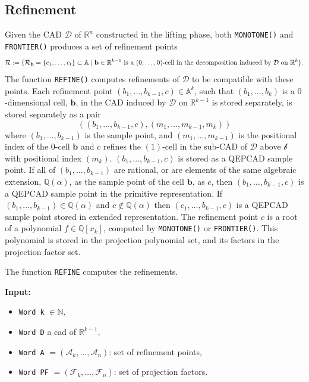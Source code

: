 \documentclass[
]{book}
\providecommand{\tightlist}{%
  \setlength{\itemsep}{0pt}\setlength{\parskip}{0pt}}
\theoremstyle{definition}
\theoremstyle{definition}
\theoremstyle{definition}
\theoremstyle{definition}
\theoremstyle{remark}
\begin{document}
\hypertarget{sec:implementation-refinement}{%
\subsection{Refinement}\label{sec:implementation-refinement}}

Given the CAD \(\mathcal{D}\) of \(\mathbb{R}^n\) constructed in the lifting phase, both \texttt{MONOTONE()} and \texttt{FRONTIER()} produces a set of refinement points
\[
{\cal R} := \{ {\cal R}_{\mathbf{b}} = \{ c_1,\ldots,c_t \} \subset \mathbb{A}\mid \mathbf{b} \in \mathbb{R}^{k-1} \text{ is a } (0,\ldots,0) \text{-cell in the decomposition induced by } {\cal D} \text{ on } \mathbb{R}^k \}.
\]
The function \texttt{REFINE()} computes refinements of \(\mathcal{D}\) to be compatible with these points. Each refinement point \((b_1,\ldots,b_{k-1},c) \in \mathbb{A}^k\), such that \((b_1,\ldots,b_k)\) is a \(0\)-dimensional cell, \(\mathbf{b}\), in the CAD induced by \(\mathcal{D}\) on \(\mathbb{R}^{k-1}\) is stored separately, is stored separately as a pair
\[
((b_1,\ldots,b_{k-1},c), (m_1,\ldots,m_{k-1},m_k))
\]
where \((b_1,\ldots,b_{k-1})\) is the sample point, and \((m_1,\ldots,m_{k-1})\) is the positional index of the \(0\)-cell \(\mathbf{b}\) and \(c\) refines the \((1)\)-cell in the sub-CAD of \(\mathcal{D}\) above \(\mathcal{b}\) with positional index \((m_k)\).
\((b_1,\ldots,b_{k-1},c)\) is stored as a QEPCAD sample point.
If all of \((b_1,\ldots,b_{k-1})\) are rational, or are elements of the same algebraic extension, \(\mathbb{Q}(\alpha)\), as the sample point of the cell \(\mathbf{b}\), as \(c\), then \((b_1,\ldots,b_{k-1},c)\) is a QEPCAD sample point in the primitive representation. If \((b_1,\ldots,b_{k-1}) \in \mathbb{Q}(\alpha)\) and \(c \not \in \mathbb{Q}(\alpha)\) then \((c_1,\ldots,b_{k-1},c)\) is a QEPCAD sample point stored in extended representation.
The refinement point \(c\) is a root of a polynomial \(f \in \mathbb{Q}[x_k]\), computed by \texttt{MONOTONE()} or \texttt{FRONTIER()}. This polynomial is stored in the projection polynomial set, and its factors in the projection factor set.

The function \texttt{REFINE} computes the refinements.

\textbf{Input:}

\begin{itemize}
\tightlist
\item
  \texttt{Word\ k} \(\in \mathbb{N}\),
\item
  \texttt{Word\ D} a cad of \(\mathbb{R}^{k-1}\),
\item
  \texttt{Word\ A} \(= (\mathcal{A}_k, \ldots, \mathcal{A}_n)\): set of refinement points,
\item
  \texttt{Word\ PF} \(= (\mathcal{F}_k, \ldots, \mathcal{F}_n)\): set of projection factors.
\end{itemize}
\end{document}
